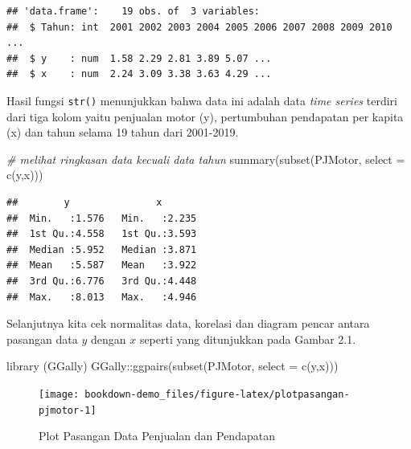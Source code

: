 \documentclass[
]{book}
\newenvironment{Shaded}{\begin{snugshade}}{\end{snugshade}}
\newcommand{\AttributeTok}[1]{\textcolor[rgb]{0.77,0.63,0.00}{#1}}
\newcommand{\CommentTok}[1]{\textcolor[rgb]{0.56,0.35,0.01}{\textit{#1}}}
\newcommand{\FunctionTok}[1]{\textcolor[rgb]{0.00,0.00,0.00}{#1}}
\newcommand{\NormalTok}[1]{#1}
\newcommand{\SpecialCharTok}[1]{\textcolor[rgb]{0.00,0.00,0.00}{#1}}
\begin{document}
\begin{verbatim}
## 'data.frame':    19 obs. of  3 variables:
##  $ Tahun: int  2001 2002 2003 2004 2005 2006 2007 2008 2009 2010 ...
##  $ y    : num  1.58 2.29 2.81 3.89 5.07 ...
##  $ x    : num  2.24 3.09 3.38 3.63 4.29 ...
\end{verbatim}

Hasil fungsi \texttt{str()} menunjukkan bahwa data ini adalah data \emph{time series} terdiri dari tiga kolom yaitu penjualan motor (y), pertumbuhan pendapatan per kapita (x) dan tahun selama 19 tahun dari 2001-2019.

\begin{Shaded}
\begin{Highlighting}[]
\CommentTok{\# melihat ringkasan data kecuali data tahun}
\FunctionTok{summary}\NormalTok{(}\FunctionTok{subset}\NormalTok{(PJMotor, }\AttributeTok{select =} \FunctionTok{c}\NormalTok{(y,x)))}
\end{Highlighting}
\end{Shaded}

\begin{verbatim}
##        y               x        
##  Min.   :1.576   Min.   :2.235  
##  1st Qu.:4.558   1st Qu.:3.593  
##  Median :5.952   Median :3.871  
##  Mean   :5.587   Mean   :3.922  
##  3rd Qu.:6.776   3rd Qu.:4.448  
##  Max.   :8.013   Max.   :4.946
\end{verbatim}

Selanjutnya kita cek normalitas data, korelasi dan diagram pencar antara pasangan data \(y\) dengan \(x\) seperti yang ditunjukkan pada Gambar 2.1.

\begin{Shaded}
\begin{Highlighting}[]
\FunctionTok{library}\NormalTok{ (GGally)}
\NormalTok{GGally}\SpecialCharTok{::}\FunctionTok{ggpairs}\NormalTok{(}\FunctionTok{subset}\NormalTok{(PJMotor, }\AttributeTok{select =} \FunctionTok{c}\NormalTok{(y,x)))}
\end{Highlighting}
\end{Shaded}

\begin{figure}[H]

{\centering \texttt{[image: bookdown-demo\_files/figure-latex/plotpasangan-pjmotor-1]} 

}

\caption{Plot Pasangan Data Penjualan dan Pendapatan}\label{fig:plotpasangan-pjmotor}
\end{figure}
\end{document}
